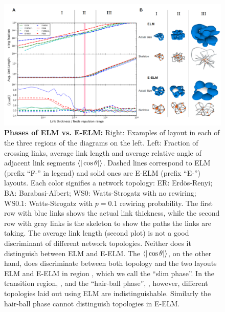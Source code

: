 \documentclass[nofootinbib,preprint,endfloats]{revtex4} %
\newcommand{\RNum}[1]{\uppercase\expandafter{\romannumeral #1\relax}}
\begin{document}
\begin{figure}
    \centering
    \includegraphics[width=1\columnwidth]{fig-09-19/phase-compare-4.png}
    \caption{{\bf Phases of ELM vs. E-ELM:} Right: Examples of layout in each of the three regions of the diagrams on the left. 
    Left: Fraction of crossing links, average link length and average relative angle of adjacent link segments $\be{|\cos\theta |}$. 
    Dashed lines correspond to ELM (prefix ``F-'' in legend) and solid ones are E-ELM (prefix ``E-'') layouts. 
    Each color signifies a network topology: ER: Erd\"os-Renyi; BA: Barabasi-Albert; WS0: Watts-Strogatz with no rewiring; WS0.1: Watts-Strogatz with $p=0.1$ rewiring probability. 
    The first row with blue links shows the actual link thickness, while the second row with gray links is the skeleton to show the paths the links are taking.
    The average link length (second plot) is not a good discriminant of different network topologies. Neither does it distinguish between ELM and E-ELM. The $\be{|\cos\theta |}$, on the other hand, does discriminate between both topology and the two layouts ELM and E-ELM in region \RNum{1}, which we call the ``slim phase''. In the transition region, \RNum{2}, and the ``hair-ball phase'', \RNum{3}, however, different topologies laid out using ELM are indistinguishable. Similarly the hair-ball phase cannot distinguish topologies in E-ELM. }
    \label{fig:phase-compare}
\end{figure}
\end{document}
